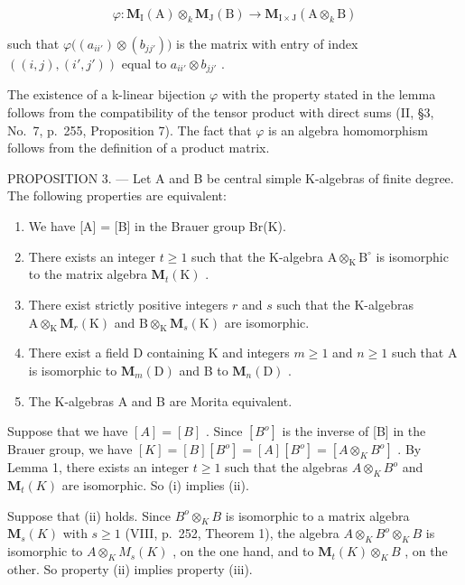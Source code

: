 \[
\varphi : \mathbf {M} _ {\mathrm{I}} (\mathrm{A}) \otimes_ {k} \mathbf {M} _ {\mathrm{J}} (\mathrm{B}) \longrightarrow \mathbf {M} _ {\mathrm{I} \times \mathrm{J}} (\mathrm{A} \otimes_ {k} \mathrm{B})
\]

such that \(\varphi\big((a_{ii'})\otimes(b_{jj'})\big)\) is the matrix with entry of index \(((i,j),(i',j'))\) equal to \(a_{ii'}\otimes b_{jj'}\) .

The existence of a k-linear bijection \(\varphi\) with the property stated in the lemma follows from the compatibility of the tensor product with direct sums (II, §3, No.~7, p.~255, Proposition 7). The fact that \(\varphi\) is an algebra homomorphism follows from the definition of a product matrix.

PROPOSITION 3. --- Let A and B be central simple K-algebras of finite degree. The following properties are equivalent:

\begin{enumerate}
\def\labelenumi{(\roman{enumi})}
\item
  We have {[}A{]} = {[}B{]} in the Brauer group Br(K).
\item
  There exists an integer \(t \geqslant 1\) such that the K-algebra \(\mathrm{A} \otimes_{\mathrm{K}} \mathrm{B}^{\circ}\) is isomorphic to the matrix algebra \(\mathbf{M}_t(\mathrm{K})\) .
\item
  There exist strictly positive integers \(r\) and \(s\) such that the K-algebras \(\mathrm{A} \otimes_{\mathrm{K}} \mathbf{M}_r(\mathrm{K})\) and \(\mathrm{B} \otimes_{\mathrm{K}} \mathbf{M}_s(\mathrm{K})\) are isomorphic.
\item
  There exist a field D containing K and integers \(m \geqslant 1\) and \(n \geqslant 1\) such that A is isomorphic to \(\mathbf{M}_{m}(\mathrm{D})\) and B to \(\mathbf{M}_{n}(\mathrm{D})\) .
\item
  The K-algebras A and B are Morita equivalent.
\end{enumerate}

Suppose that we have \([A]=[B]\) . Since \([B^{o}]\) is the inverse of {[}B{]} in the Brauer group, we have \([K]=[B][B^{o}]=[A][B^{o}]=[A\otimes_{K}B^{o}]\) . By Lemma 1, there exists an integer \(t\geqslant1\) such that the algebras \(A\otimes_{K}B^{o}\) and \(\mathbf{M}_{t}(K)\) are isomorphic. So (i) implies (ii).

Suppose that (ii) holds. Since \(B^{o} \otimes_{K} B\) is isomorphic to a matrix algebra \(\mathbf{M}_{s}(K)\) with \(s \geqslant 1\) (VIII, p.~252, Theorem 1), the algebra \(A \otimes_{K} B^{o} \otimes_{K} B\) is isomorphic to \(A \otimes_{K} M_{s}(K)\) , on the one hand, and to \(\mathbf{M}_{t}(K) \otimes_{K} B\) , on the other. So property (ii) implies property (iii).

